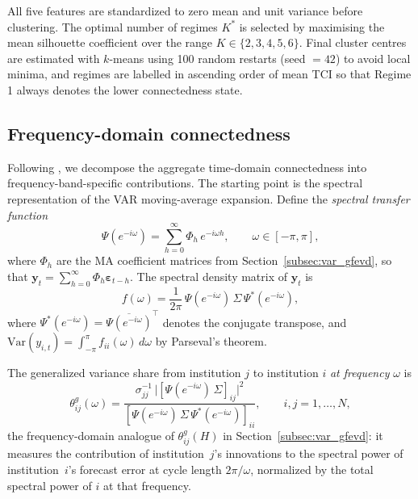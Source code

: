 All five features are standardized to zero mean and unit variance before clustering. The
optimal number of regimes $K^*$ is selected by maximising the mean silhouette coefficient
over the range $K \in \{2, 3, 4, 5, 6\}$. Final cluster centres are estimated with
$k$-means using 100 random restarts (seed $= 42$) to avoid local minima, and regimes are
labelled in ascending order of mean TCI so that Regime 1 always denotes the lower
connectedness state.

\subsection{Frequency-domain connectedness}\label{subsec:freq_conn}

Following \citet{BarunikKrehlik2018}, we decompose the aggregate time-domain
connectedness into frequency-band-specific contributions. The starting point is the
spectral representation of the VAR moving-average expansion. Define the
\emph{spectral transfer function}
\begin{equation}\label{eq:transfer}
  \Psi(e^{-i\omega})
  = \sum_{h=0}^{\infty} \Phi_h\, e^{-i\omega h},
  \qquad \omega \in [-\pi, \pi],
\end{equation}
where $\Phi_h$ are the MA coefficient matrices from Section~\ref{subsec:var_gfevd},
so that $\mathbf{y}_t = \sum_{h=0}^\infty \Phi_h \boldsymbol{\varepsilon}_{t-h}$.
The spectral density matrix of $\mathbf{y}_t$ is
\begin{equation}\label{eq:spectral_density}
  f(\omega)
  = \frac{1}{2\pi}\,\Psi(e^{-i\omega})\,\Sigma\,\Psi^*(e^{-i\omega}),
\end{equation}
where $\Psi^*(e^{-i\omega}) = \overline{\Psi(e^{-i\omega})}^{\!\top}$ denotes the
conjugate transpose, and $\mathrm{Var}(y_{i,t}) = \int_{-\pi}^{\pi} f_{ii}(\omega)\,d\omega$
by Parseval's theorem.

The generalized variance share from institution $j$ to institution $i$
\emph{at frequency} $\omega$ is
\begin{equation}\label{eq:theta_freq}
  \theta^g_{ij}(\omega)
  = \frac{
      \sigma_{jj}^{-1}\,
      \bigl|[\Psi(e^{-i\omega})\,\Sigma]_{ij}\bigr|^{2}
    }{
      [\Psi(e^{-i\omega})\,\Sigma\,\Psi^*(e^{-i\omega})]_{ii}
    },
  \qquad i,j = 1,\dots,N,
\end{equation}
the frequency-domain analogue of $\theta^g_{ij}(H)$ in
Section~\ref{subsec:var_gfevd}: it measures the contribution of institution~$j$'s
innovations to the spectral power of institution~$i$'s forecast error at cycle
length $2\pi/\omega$, normalized by the total spectral power of $i$ at that frequency.

